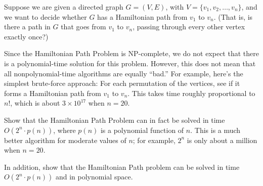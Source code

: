 \newpage
{} %

\problemdes

Suppose we are given a directed graph $G = (V,E)$, with $V = \{v_1,v_2, \dots,v_n\}$, and we want to decide whether $G$ has a Hamiltonian path from $v_1$ to $v_n$. (That is, is there a path in $G$ that goes from $v_1$ to $v_n$, passing through every other vertex exactly once?)

Since the Hamiltonian Path Problem is NP-complete, we do not expect that there is a polynomial-time solution for this problem. However, this does not mean that all nonpolynomial-time algorithms are equally “bad.” For example, here’s the simplest brute-force approach: For each permutation of the vertices, see if it forms a Hamiltonian path from $v_1$ to $v_n$. This takes time roughly proportional to $n!$, which is about $3\times10^{17}$ when $n = 20$.

Show that the Hamiltonian Path Problem can in fact be solved in time $O(2^n \cdot p(n))$, where $p(n)$ is a polynomial function of $n$. This is a much better algorithm for moderate values of $n$; for example, $2^n$ is only about a million when $n = 20$.

In addition, show that the Hamiltonian Path problem can be solved in time $O(2^n \cdot p(n))$ and in polynomial space.

\solution






